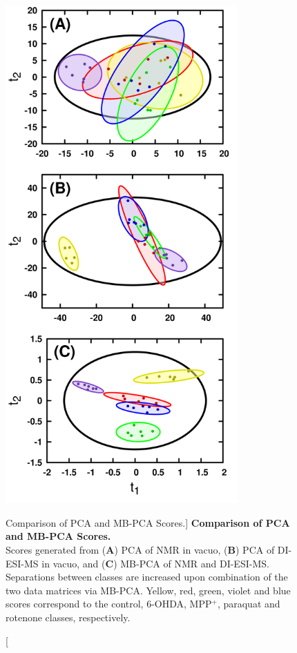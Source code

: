 \begin{figure}
\includegraphics[width=3.5in]{figs/apps/07-mbpca-t.png}
\caption
      [Comparison of PCA and MB-PCA Scores.]{
  {\bf Comparison of PCA and MB-PCA Scores.}
  \\
  Scores generated from ({\bf A}) PCA of \hnmr{} NMR in vacuo, ({\bf B}) PCA
  of DI-ESI-MS in vacuo, and ({\bf C}) MB-PCA of \hnmr{} NMR and DI-ESI-MS.
  Separations between classes are increased upon combination of the two
  data matrices via MB-PCA. Yellow, red, green, violet and blue scores
  correspond to the control, 6-OHDA, MPP$^+$, paraquat and rotenone classes,
  respectively.
}
\end{figure}

